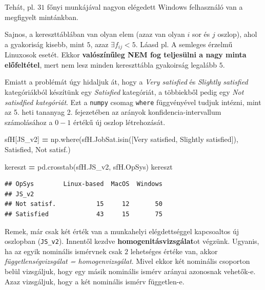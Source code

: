 \documentclass[
]{book}
\newenvironment{Shaded}{\begin{snugshade}}{\end{snugshade}}
\newcommand{\NormalTok}[1]{#1}
\newcommand{\OperatorTok}[1]{\textcolor[rgb]{0.81,0.36,0.00}{\textbf{#1}}}
\newcommand{\StringTok}[1]{\textcolor[rgb]{0.31,0.60,0.02}{#1}}
\begin{document}
Tehát, pl. \(31\) főnyi munkájával nagyon elégedett Windows felhasználó van a megfigyelt mintánkban.

Sajnos, a kereszttáblában van olyan elem (azaz van olyan \(i\) sor és \(j\) oszlop), ahol a gyakoriság kisebb, mint \(5\), azaz \(\exists f_{ij}<5\). Láasd pl. A semleges érzelmű Linuxosok esetét. Ekkor \textbf{valószínűleg NEM fog teljesülni a nagy minta előfeltétel}, mert nem lesz minden kereszttábla gyakoirság legalább \(5\).

Emiatt a problémát úgy hidaljuk át, hogy a \emph{Very satisfied} és \emph{Slightly satisfied} kategóriákból készítünk egy \emph{Satisfied} kategóriát, a többiekből pedig egy \emph{Not satisdfied kategóriát}. Ezt a \texttt{numpy} csomag \texttt{where} függvényével tudjuk intézni, mint az 5. heti tananyag 2. fejezetében az arányok konfidencia-intervallum számolásához a \(0-1\) értékű új oszlop létrehozását.

\begin{Shaded}
\begin{Highlighting}[]
\NormalTok{sfH[}\StringTok{\textquotesingle{}JS\_v2\textquotesingle{}}\NormalTok{] }\OperatorTok{=}\NormalTok{ np.where(sfH.JobSat.isin([}\StringTok{\textquotesingle{}Very satisfied\textquotesingle{}}\NormalTok{,}
                                         \StringTok{\textquotesingle{}Slightly satisfied\textquotesingle{}}\NormalTok{]),}
                        \StringTok{\textquotesingle{}Satisfied\textquotesingle{}}\NormalTok{, }\StringTok{\textquotesingle{}Not satisf.\textquotesingle{}}\NormalTok{)}


\NormalTok{kereszt }\OperatorTok{=}\NormalTok{ pd.crosstab(sfH.JS\_v2, sfH.OpSys)}
\NormalTok{kereszt}
\end{Highlighting}
\end{Shaded}

\begin{verbatim}
## OpSys        Linux-based  MacOS  Windows
## JS_v2                                   
## Not satisf.           15     12       50
## Satisfied             43     15       75
\end{verbatim}

Remek, már csak két érték van a munkahelyi elégdettséggel kapcsoaltos új oszlopban (\texttt{JS\_v2}). Innentől kezdve \textbf{homogenitásvizsgálat}ot végzünk. Ugyanis, ha az egyik nominális ismérvnek csak \(2\) lehetséges értéke van, akkor \emph{függetlenségvizsgálat = homogenvizsgálat}. Mivel ekkor két nominális csoporton belül vizsgáljuk, hogy egy másik nominális ismérv arányai azonosnak vehetők-e. Azaz vizsgáljuk, hogy a két nominális ismérv független-e.
\end{document}
